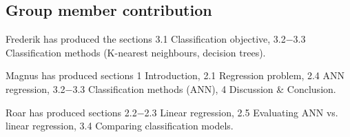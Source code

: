 \subsection{Group member contribution}
Frederik has produced the sections 3.1 Classification objective, 3.2$-$3.3 Classification methods (K-nearest neighbours, decision trees).

Magnus has produced sections 1 Introduction, 2.1 Regression problem, 2.4 ANN regression, 3.2$-$3.3 Classification methods (ANN), 4 Discussion \& Conclusion.

Roar has produced sections 2.2$-$2.3 Linear regression, 2.5 Evaluating ANN vs. linear regression, 3.4 Comparing classification models.
